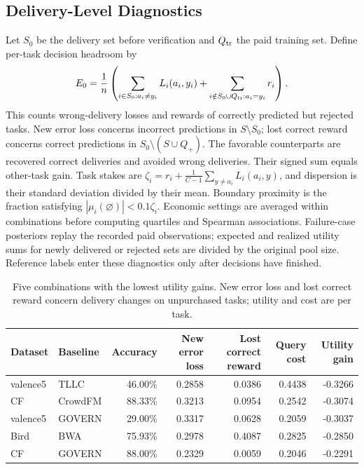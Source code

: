 \documentclass[journal]{IEEEtran}
\newcommand{\smalltable}{\footnotesize\setlength{\tabcolsep}{3.5pt}}
\begin{document}
\subsection{Delivery-Level Diagnostics}
Let $S_0$ be the delivery set before verification and $Q_{\rm tr}$ the paid training set. Define per-task decision headroom by
\begin{equation}
 E_0=\frac1n\left(\sum_{i\in S_0:a_i\ne y_i}L_i(a_i,y_i)+\sum_{i\notin S_0\cup Q_{\rm tr}:a_i=y_i}r_i\right).
\end{equation}
This counts wrong-delivery losses and rewards of correctly predicted but rejected tasks. New error loss concerns incorrect predictions in $S\setminus S_0$; lost correct reward concerns correct predictions in $S_0\setminus(S\cup Q_+)$. The favorable counterparts are recovered correct deliveries and avoided wrong deliveries. Their signed sum equals other-task gain. Task stakes are $\zeta_i=r_i+\frac1{C-1}\sum_{y\ne a_i}L_i(a_i,y)$, and dispersion is their standard deviation divided by their mean. Boundary proximity is the fraction satisfying $|\mu_i(\varnothing)|<0.1\zeta_i$. Economic settings are averaged within combinations before computing quartiles and Spearman associations. Failure-case posteriors replay the recorded paid observations; expected and realized utility sums for newly delivered or rejected sets are divided by the original pool size. Reference labels enter these diagnostics only after decisions have finished.

\begin{table}[t]
\caption{Five combinations with the lowest utility gains. New error loss and lost correct reward concern delivery changes on unpurchased tasks; utility and cost are per task.}
\label{tab:failures}\centering\smalltable
\begin{tabular}{llrrrrr}
\toprule
Dataset & Baseline & Accuracy & New error loss & Lost correct reward & Query cost & Utility gain \\
\midrule
valence5 & TLLC & 46.00\% & 0.2858 & 0.0386 & 0.4438 & -0.3266 \\
CF & CrowdFM & 88.33\% & 0.3213 & 0.0954 & 0.2542 & -0.3074 \\
valence5 & GOVERN & 29.00\% & 0.3317 & 0.0628 & 0.2059 & -0.3037 \\
Bird & BWA & 75.93\% & 0.2978 & 0.4087 & 0.2825 & -0.2850 \\
CF & GOVERN & 88.00\% & 0.2329 & 0.0059 & 0.2046 & -0.2291 \\
\bottomrule
\end{tabular}

\end{table}
\end{document}
